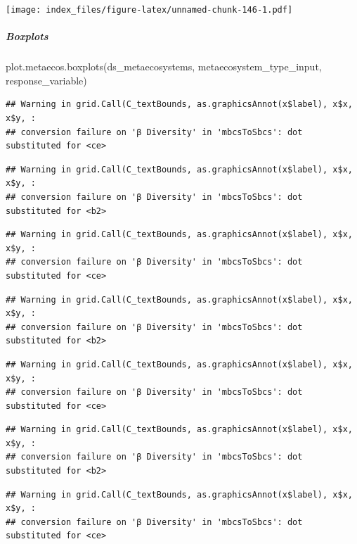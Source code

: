 \documentclass[
]{article}
\newenvironment{Shaded}{\begin{snugshade}}{\end{snugshade}}
\newcommand{\FunctionTok}[1]{\textcolor[rgb]{0.00,0.00,0.00}{#1}}
\newcommand{\NormalTok}[1]{#1}
\begin{document}
\texttt{[image: index\_files/figure-latex/unnamed-chunk-146-1.pdf]}

\hypertarget{boxplots-2}{%
\subparagraph{Boxplots}\label{boxplots-2}}

\begin{Shaded}
\begin{Highlighting}[]
\FunctionTok{plot.metaecos.boxplots}\NormalTok{(ds\_metaecosystems, metaecosystem\_type\_input,}
\NormalTok{                       response\_variable)}
\end{Highlighting}
\end{Shaded}

\begin{verbatim}
## Warning in grid.Call(C_textBounds, as.graphicsAnnot(x$label), x$x, x$y, :
## conversion failure on 'β Diversity' in 'mbcsToSbcs': dot substituted for <ce>
\end{verbatim}

\begin{verbatim}
## Warning in grid.Call(C_textBounds, as.graphicsAnnot(x$label), x$x, x$y, :
## conversion failure on 'β Diversity' in 'mbcsToSbcs': dot substituted for <b2>
\end{verbatim}

\begin{verbatim}
## Warning in grid.Call(C_textBounds, as.graphicsAnnot(x$label), x$x, x$y, :
## conversion failure on 'β Diversity' in 'mbcsToSbcs': dot substituted for <ce>
\end{verbatim}

\begin{verbatim}
## Warning in grid.Call(C_textBounds, as.graphicsAnnot(x$label), x$x, x$y, :
## conversion failure on 'β Diversity' in 'mbcsToSbcs': dot substituted for <b2>
\end{verbatim}

\begin{verbatim}
## Warning in grid.Call(C_textBounds, as.graphicsAnnot(x$label), x$x, x$y, :
## conversion failure on 'β Diversity' in 'mbcsToSbcs': dot substituted for <ce>
\end{verbatim}

\begin{verbatim}
## Warning in grid.Call(C_textBounds, as.graphicsAnnot(x$label), x$x, x$y, :
## conversion failure on 'β Diversity' in 'mbcsToSbcs': dot substituted for <b2>
\end{verbatim}

\begin{verbatim}
## Warning in grid.Call(C_textBounds, as.graphicsAnnot(x$label), x$x, x$y, :
## conversion failure on 'β Diversity' in 'mbcsToSbcs': dot substituted for <ce>
\end{verbatim}
\end{document}
